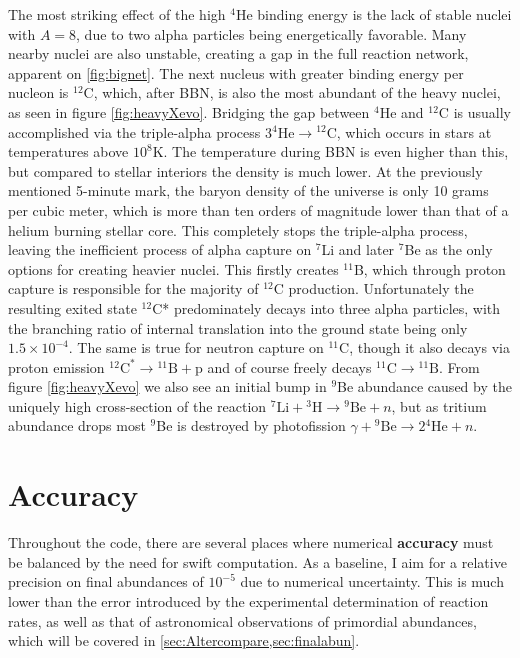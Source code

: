The most striking effect of the high ${}^4$He binding energy is the lack of stable nuclei with $A=8$, due to two alpha particles being energetically favorable. Many nearby nuclei are also unstable, creating a gap in the full reaction network, apparent on \ref{fig:bignet}. The next nucleus with greater binding energy per nucleon is ${}^{12}$C, which, after BBN, is also the most abundant of the heavy nuclei, as seen in figure \ref{fig:heavyXevo}. Bridging the gap between ${}^4$He and ${}^{12}$C is usually accomplished via the triple-alpha process $3{}^4\text{He}\rightarrow {}^{12}\text{C}$, which occurs in stars at temperatures above $10^8$K. The temperature during BBN is even higher than this, but compared to stellar interiors the density is much lower. At the previously mentioned 5-minute mark, the baryon density of the universe is only 10 grams per cubic meter, which is more than ten orders of magnitude lower than that of a helium burning stellar core. This completely stops the triple-alpha process, leaving the inefficient process of alpha capture on ${}^7$Li and later ${}^7$Be as the only options for creating heavier nuclei. This firstly creates ${}^{11}$B, which through proton capture is responsible for the majority of ${}^{12}$C production. Unfortunately the resulting exited state ${}^{12}$C* predominately decays into three alpha particles, with the branching ratio of internal translation into the ground state being only $1.5\times 10^{-4}$. The same is true for neutron capture on ${}^{11}$C, though it also decays via proton emission  ${}^{12}\text{C}^\ast \rightarrow {}^{11}\text{B}+\text{p}$ and of course freely decays ${}^{11}\text{C}\rightarrow {}^{11}\text{B}$. From figure \ref{fig:heavyXevo} we also see an initial bump in ${}^9$Be abundance caused by the uniquely high cross-section of the reaction ${}^7\text{Li}+{}^3\text{H}\rightarrow {}^9\text{Be}+n$, but as tritium abundance drops most ${}^9$Be is destroyed by photofission $\gamma+{}^9\text{Be}\rightarrow 2{}^4\text{He}+n$.


\section{Accuracy}
\label{sec:Accuracy}
Throughout the code, there are several places where numerical \textbf{accuracy} must be balanced by the need for swift computation. As a baseline, I aim for a relative precision on final abundances of $10^{-5}$ due to numerical uncertainty. This is much lower than the error introduced by the experimental determination of reaction rates, as well as that of astronomical observations of primordial abundances, which will be covered in \cref{sec:Altercompare,sec:finalabun}.

